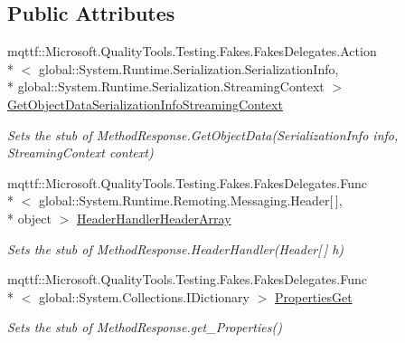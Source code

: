 \subsection*{Public Attributes}
\begin{DoxyCompactItemize}
\item 
mqttf\-::\-Microsoft.\-Quality\-Tools.\-Testing.\-Fakes.\-Fakes\-Delegates.\-Action\\*
$<$ global\-::\-System.\-Runtime.\-Serialization.\-Serialization\-Info, \\*
global\-::\-System.\-Runtime.\-Serialization.\-Streaming\-Context $>$ \hyperlink{class_system_1_1_runtime_1_1_remoting_1_1_messaging_1_1_fakes_1_1_stub_method_response_a14f547cc9e513a4b1625384aa58e2e47}{Get\-Object\-Data\-Serialization\-Info\-Streaming\-Context}
\begin{DoxyCompactList}\small\item\em Sets the stub of Method\-Response.\-Get\-Object\-Data(\-Serialization\-Info info, Streaming\-Context context)\end{DoxyCompactList}\item 
mqttf\-::\-Microsoft.\-Quality\-Tools.\-Testing.\-Fakes.\-Fakes\-Delegates.\-Func\\*
$<$ global\-::\-System.\-Runtime.\-Remoting.\-Messaging.\-Header\mbox{[}$\,$\mbox{]}, \\*
object $>$ \hyperlink{class_system_1_1_runtime_1_1_remoting_1_1_messaging_1_1_fakes_1_1_stub_method_response_a0bbde81d5f0f9f5fcaea087374c858b0}{Header\-Handler\-Header\-Array}
\begin{DoxyCompactList}\small\item\em Sets the stub of Method\-Response.\-Header\-Handler(\-Header\mbox{[}$\,$\mbox{]} h)\end{DoxyCompactList}\item 
mqttf\-::\-Microsoft.\-Quality\-Tools.\-Testing.\-Fakes.\-Fakes\-Delegates.\-Func\\*
$<$ global\-::\-System.\-Collections.\-I\-Dictionary $>$ \hyperlink{class_system_1_1_runtime_1_1_remoting_1_1_messaging_1_1_fakes_1_1_stub_method_response_a972e7110a0245aa8945c266a5c2d511d}{Properties\-Get}
\begin{DoxyCompactList}\small\item\em Sets the stub of Method\-Response.\-get\-\_\-\-Properties()\end{DoxyCompactList}\end{DoxyCompactItemize}
